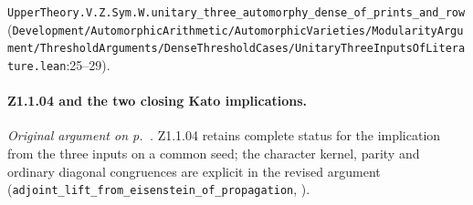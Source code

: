 {\footnotesize \nolinkurl{UpperTheory.V.Z.Sym.W.unitary_three_automorphy_dense_of_prints_and_row} (\nolinkurl{Development/AutomorphicArithmetic/AutomorphicVarieties/ModularityArgument/ThresholdArguments/DenseThresholdCases/UnitaryThreeInputsOfLiterature.lean}\allowbreak:25--29).}

\paragraph{Z1.1.04 and the two closing Kato implications.}\label{r6:review:Z1.1.04} \emph{Original argument on p.~\pageref{r5:Z1.1.04}.} 
Z1.1.04 retains complete status for the implication from the three inputs on a common seed; the character kernel, parity and ordinary diagonal congruences are explicit in the revised argument (\nolinkurl{adjoint_lift_from_eisenstein_of_propagation}, ).

